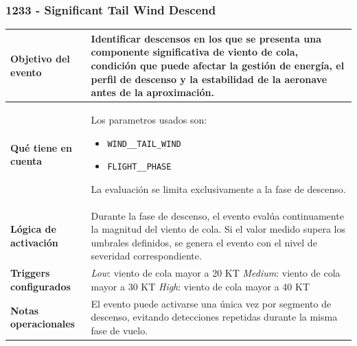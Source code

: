 \documentclass[11pt,a4paper]{article}
\begin{document}
	\subsubsection{1233 - Significant Tail Wind Descend}
	\begin{table}[H]
		\centering
		\renewcommand{\arraystretch}{1.3}
		\begin{tabular}{p{5cm} p{9.5cm}}
			\hline
			\textbf{Objetivo del evento} &
			Identificar descensos en los que se presenta una componente significativa de viento de cola, condición que puede afectar la gestión de energía, el perfil de descenso y la estabilidad de la aeronave antes de la aproximación. \\
			\hline
			\textbf{Qué tiene en cuenta} & Los parametros usados son:
			\begin{itemize}
				\item \texttt{WIND\_\_TAIL\_WIND}
				\item \texttt{FLIGHT\_\_PHASE}
			\end{itemize}
			La evaluación se limita exclusivamente a la fase de descenso. \\
			\hline
			\textbf{Lógica de activación} &
			Durante la fase de descenso, el evento evalúa continuamente la magnitud del viento de cola. Si el valor medido supera los umbrales definidos, se genera el evento con el nivel de severidad correspondiente. \\
			\hline
			\textbf{Triggers configurados} &
			\textit{Low}: viento de cola mayor a 20 KT \newline
			\textit{Medium}: viento de cola mayor a 30 KT \newline
			\textit{High}: viento de cola mayor a 40 KT \\
			\hline
			\textbf{Notas operacionales} &
			El evento puede activarse una única vez por segmento de descenso, evitando detecciones repetidas durante la misma fase de vuelo. \\
			\hline
		\end{tabular}
	\end{table}
\end{document}
